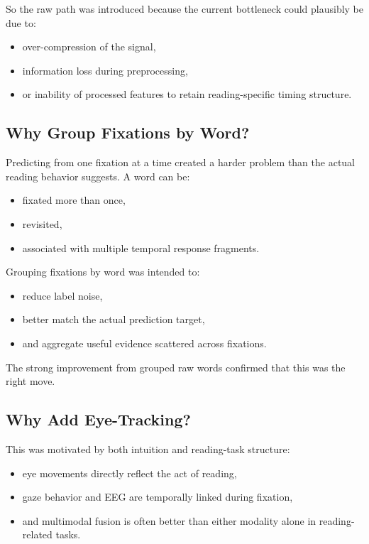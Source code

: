 \documentclass[11pt]{article}
\begin{document}
So the raw path was introduced because the current bottleneck could plausibly be due to:
\begin{itemize}
    \item over-compression of the signal,
    \item information loss during preprocessing,
    \item or inability of processed features to retain reading-specific timing structure.
\end{itemize}

\subsection{Why Group Fixations by Word?}

Predicting from one fixation at a time created a harder problem than the actual reading behavior suggests. A word can be:
\begin{itemize}
    \item fixated more than once,
    \item revisited,
    \item associated with multiple temporal response fragments.
\end{itemize}

Grouping fixations by word was intended to:
\begin{itemize}
    \item reduce label noise,
    \item better match the actual prediction target,
    \item and aggregate useful evidence scattered across fixations.
\end{itemize}

The strong improvement from grouped raw words confirmed that this was the right move.

\subsection{Why Add Eye-Tracking?}

This was motivated by both intuition and reading-task structure:
\begin{itemize}
    \item eye movements directly reflect the act of reading,
    \item gaze behavior and EEG are temporally linked during fixation,
    \item and multimodal fusion is often better than either modality alone in reading-related tasks.
\end{itemize}
\end{document}
